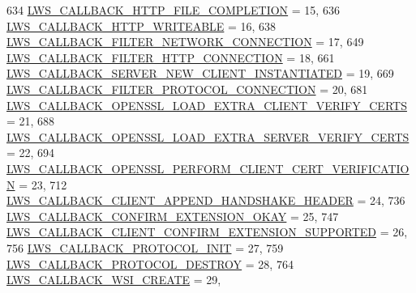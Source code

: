 \begin{DoxyCode}
634         \hyperlink{group__usercb_ggad62860e19975ba4c4af401c3cdb6abf7aa627548e1296e654fcfab463ec3c9587}{LWS\_CALLBACK\_HTTP\_FILE\_COMPLETION}                      = 15,
636         \hyperlink{group__usercb_ggad62860e19975ba4c4af401c3cdb6abf7afedadfb3cde37a8ea4c84ed535f26d09}{LWS\_CALLBACK\_HTTP\_WRITEABLE}                          = 16,
638         \hyperlink{group__usercb_ggad62860e19975ba4c4af401c3cdb6abf7a026502768778b8d79d62dd0fe4375fc6}{LWS\_CALLBACK\_FILTER\_NETWORK\_CONNECTION}                    = 
      17,
649         \hyperlink{group__usercb_ggad62860e19975ba4c4af401c3cdb6abf7a75199176c82c1a56e4a6bbf1cc30c12c}{LWS\_CALLBACK\_FILTER\_HTTP\_CONNECTION}                  = 18,
661         \hyperlink{group__usercb_ggad62860e19975ba4c4af401c3cdb6abf7ae9734e1d7af2abf291665ce9e4a728d3}{LWS\_CALLBACK\_SERVER\_NEW\_CLIENT\_INSTANTIATED}          = 
      19,
669         \hyperlink{group__usercb_ggad62860e19975ba4c4af401c3cdb6abf7accd8753672d319a30b4b4c2fb775e84d}{LWS\_CALLBACK\_FILTER\_PROTOCOL\_CONNECTION}                  = 
      20,
681         \hyperlink{group__usercb_ggad62860e19975ba4c4af401c3cdb6abf7ae4986291b7a810fe290851d73bebeb1c}{LWS\_CALLBACK\_OPENSSL\_LOAD\_EXTRA\_CLIENT\_VERIFY\_CERTS}  
      = 21,
688         \hyperlink{group__usercb_ggad62860e19975ba4c4af401c3cdb6abf7a06006e98d27e1e884364d88317f83493}{LWS\_CALLBACK\_OPENSSL\_LOAD\_EXTRA\_SERVER\_VERIFY\_CERTS}  
      = 22,
694         \hyperlink{group__usercb_ggad62860e19975ba4c4af401c3cdb6abf7ae5ad65d779b7eab32ab67ceff91a3bac}{LWS\_CALLBACK\_OPENSSL\_PERFORM\_CLIENT\_CERT\_VERIFICATION}      
      = 23,
712         \hyperlink{group__usercb_ggad62860e19975ba4c4af401c3cdb6abf7a909cc2a7018864b0b71abacc4058fd8f}{LWS\_CALLBACK\_CLIENT\_APPEND\_HANDSHAKE\_HEADER}          = 
      24,
736         \hyperlink{group__usercb_ggad62860e19975ba4c4af401c3cdb6abf7a390da3639296660a78cc1a5dcb19037e}{LWS\_CALLBACK\_CONFIRM\_EXTENSION\_OKAY}                  = 25,
747         \hyperlink{group__usercb_ggad62860e19975ba4c4af401c3cdb6abf7a1ce5b22039ca37ee224d00047596ea46}{LWS\_CALLBACK\_CLIENT\_CONFIRM\_EXTENSION\_SUPPORTED}          
      = 26,
756         \hyperlink{group__usercb_ggad62860e19975ba4c4af401c3cdb6abf7ad5d34583e3556e153eda91620b48cc49}{LWS\_CALLBACK\_PROTOCOL\_INIT}                            = 27,
759         \hyperlink{group__usercb_ggad62860e19975ba4c4af401c3cdb6abf7a54269ca88508e6efd3afdb9d360a9caa}{LWS\_CALLBACK\_PROTOCOL\_DESTROY}                              = 28,
764         \hyperlink{group__usercb_ggad62860e19975ba4c4af401c3cdb6abf7afd8fd77a1cc9405fcb4f26915d7f2d01}{LWS\_CALLBACK\_WSI\_CREATE}                                  = 29,

\end{DoxyCode}
